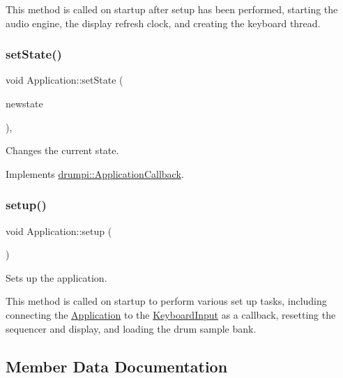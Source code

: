This method is called on startup after setup has been performed, starting the audio engine, the display refresh clock, and creating the keyboard thread. \mbox{\label{classdrumpi_1_1Application_a39fcfaf7262d03c0c6824edcd552de4f}} 
\subsubsection{\texorpdfstring{set\+State()}{setState()}}
{\footnotesize\ttfamily void Application\+::set\+State (\begin{DoxyParamCaption}\item[{\hyperlink{namespacedrumpi_af70ab0854d65f24f7fa353fdc1c46bc9}{state\+Label\+\_\+t}}]{newstate }\end{DoxyParamCaption})\hspace{0.3cm}{\ttfamily [override]}, {\ttfamily [virtual]}}

Changes the current state. 

Implements \hyperlink{classdrumpi_1_1ApplicationCallback_a009f5eb3ef1d4d3ee339ba3d1c6c52cf}{drumpi\+::\+Application\+Callback}.

\mbox{\label{classdrumpi_1_1Application_a31dd3f7f8fba9fc2fd32ceaff6ce36e7}} 
\subsubsection{\texorpdfstring{setup()}{setup()}}
{\footnotesize\ttfamily void Application\+::setup (\begin{DoxyParamCaption}{ }\end{DoxyParamCaption})}



Sets up the application. 

This method is called on startup to perform various set up tasks, including connecting the \hyperlink{classdrumpi_1_1Application}{Application} to the \hyperlink{classdrumpi_1_1KeyboardInput}{Keyboard\+Input} as a callback, resetting the sequencer and display, and loading the drum sample bank. 

\subsection{Member Data Documentation}
\mbox{\label{classdrumpi_1_1Application_a9205c148fcc133669c08e8134dd3b151}} 
